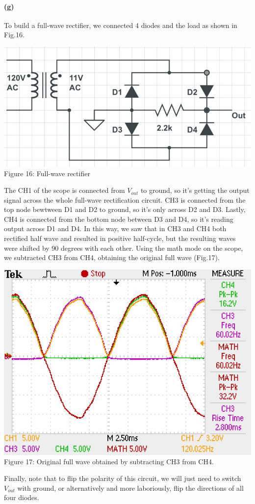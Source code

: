 \documentclass[]{article}
\begin{document}
	\paragraph{ (g)} 	
	To build a full-wave rectifier, we connected 4 diodes and the load as shown in Fig.16.
	\begin{center}
		\includegraphics[scale=0.35]{g_circuit}\\
		Figure 16: Full-wave rectifier 
	\end{center}
	The CH1 of the scope is connected from $V_{out}$ to ground, so it's getting the output signal across the whole full-wave rectification circuit. CH3 is connected from the top node bewtween D1 and D2 to ground, so it's only across D2 and D3. Lastly, CH4 is connected from the bottom node between D3 and D4, so it's reading output across D1 and D4. In this way, we saw that in CH3 and CH4 both rectified half wave and resulted in positive half-cycle, but the resulting waves were shifted by 90 degrees with each other.
	Using the math mode on the scope, we subtracted CH3 from CH4, obtaining the original full wave (Fig.17).
	\begin{center}
		\includegraphics[scale=0.8]{g_subtract}\\
		Figure 17: Original full wave obtained by subtracting CH3 from CH4.
	\end{center}
Finally, note that to flip the polarity of this circuit, we will just need to switch $V_{out}$ with ground, or alternatively and more laboriously, flip the directions of all four diodes.
		
\end{document}
